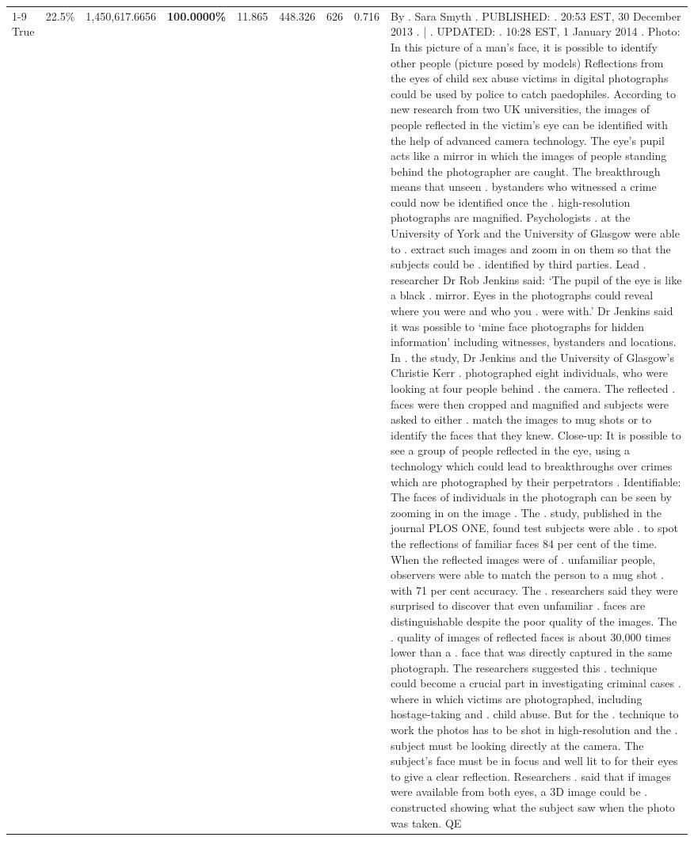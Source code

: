 \begin{table}[H]
\begin{tabular}{lllrlllll}
\cline{1-9}
True & 22.5\% & 1,450,617.6656 & \bfseries \color{red} 100.0000\% & 11.865 & 448.326 & 626 & 0.716 & By . Sara Smyth . PUBLISHED: . 20:53 EST, 30 December 2013 . | . UPDATED: . 10:28 EST, 1 January 2014 . Photo: In this picture of a man's face, it is possible to identify other people (picture posed by models) Reflections from the eyes of child sex abuse victims in digital photographs could be used by police to catch paedophiles. According to new research from two UK universities, the images of people reflected in the victim's eye can be identified with the help of advanced camera technology. The eye's pupil acts like a mirror in which the images of people standing behind the photographer are caught. The breakthrough means that unseen . bystanders who witnessed a crime could now be identified once the . high-resolution photographs are magnified. Psychologists . at the University of York and the University of Glasgow were able to . extract such images and zoom in on them so that the subjects could be . identified by third parties. Lead . researcher Dr Rob Jenkins said: ‘The pupil of the eye is like a black . mirror. Eyes in the photographs could reveal where you were and who you . were with.' Dr Jenkins said it was possible to ‘mine face photographs for hidden information' including witnesses, bystanders and locations. In . the study, Dr Jenkins and the University of Glasgow's Christie Kerr . photographed eight individuals, who were looking at four people behind . the camera. The reflected . faces were then cropped and magnified and subjects were asked to either . match the images to mug shots or to identify the faces that they knew. Close-up: It is possible to see a group of people reflected in the eye, using a technology which could lead to breakthroughs over crimes which are photographed by their perpetrators . Identifiable: The faces of individuals in the photograph can be seen by zooming in on the image . The . study, published in the journal PLOS ONE, found test subjects were able . to spot the reflections of familiar faces 84 per cent of the time. When the reflected images were of . unfamiliar people, observers were able to match the person to a mug shot . with 71 per cent accuracy. The . researchers said they were surprised to discover that even unfamiliar . faces are distinguishable despite the poor quality of the images. The . quality of images of reflected faces is about 30,000 times lower than a . face that was directly captured in the same photograph. The researchers suggested this . technique could become a crucial part in investigating criminal cases . where in which victims are photographed, including hostage-taking and . child abuse. But for the . technique to work the photos has to be shot in high-resolution and the . subject must be looking directly at the camera. The subject's face must be in focus and well lit to for their eyes to give a clear reflection. Researchers . said that if images were available from both eyes, a 3D image could be . constructed showing what the subject saw when the photo was taken. QE \\

\end{tabular}
\end{table}
